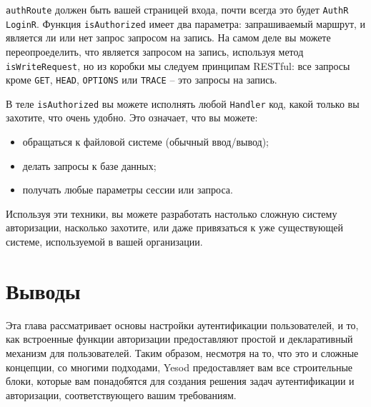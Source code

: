 \lstinline'authRoute' должен быть вашей страницей входа, почти всегда это будет \lstinline'AuthR LoginR'. Функция \lstinline'isAuthorized' имеет два параметра: запрашиваемый маршрут, и является ли или нет запрос запросом на запись. На самом деле вы можете переопроеделить, что является запросом на запись, используя метод \lstinline'isWriteRequest', но из коробки мы следуем принципам RESTful: все запросы кроме \lstinline'GET', \lstinline'HEAD', \lstinline'OPTIONS' или \lstinline'TRACE' -- это запросы на запись.

В теле \lstinline'isAuthorized' вы можете исполнять любой \lstinline'Handler' код, какой только вы захотите, что очень удобно. Это означает, что вы можете:

\begin{itemize}
    \item обращаться к файловой системе (обычный ввод/вывод);

    \item делать запросы к базе данных;

    \item получать любые параметры сессии или запроса.
\end{itemize}

Используя эти техники, вы можете разработать настолько сложную систему авторизации, насколько захотите, или даже привязаться к уже существующей системе, используемой в вашей организации.

\section{Выводы}

Эта глава рассматривает основы настройки аутентификации пользователей, и то, как встроенные функции авторизации предоставляют простой и декларативный механизм для пользователей. Таким образом, несмотря на то, что это и сложные концепции, со многими подходами, Yesod предоставляет вам все строительные блоки, которые вам понадобятся для создания решения задач аутентификации и авторизации, соответствующего вашим требованиям.
